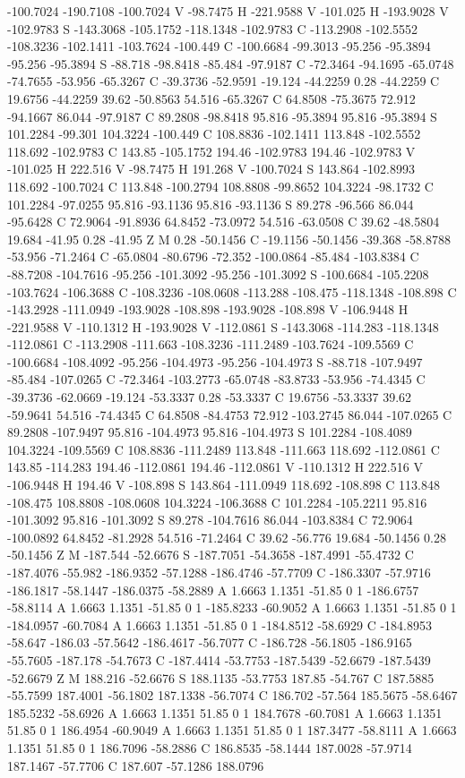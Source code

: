 {{{-100.7024 -190.7108 -100.7024 V -98.7475 H -221.9588 V -101.025 H -193.9028 V -102.9783 S -143.3068 -105.1752 -118.1348 -102.9783 C -113.2908 -102.5552 -108.3236 -102.1411 -103.7624 -100.449 C -100.6684 -99.3013 -95.256 -95.3894 -95.256 -95.3894 S -88.718 -98.8418 -85.484 -97.9187 C -72.3464 -94.1695 -65.0748 -74.7655 -53.956 -65.3267 C -39.3736 -52.9591 -19.124 -44.2259 0.28 -44.2259 C 19.6756 -44.2259 39.62 -50.8563 54.516 -65.3267 C 64.8508 -75.3675 72.912 -94.1667 86.044 -97.9187 C 89.2808 -98.8418 95.816 -95.3894 95.816 -95.3894 S 101.2284 -99.301 104.3224 -100.449 C 108.8836 -102.1411 113.848 -102.5552 118.692 -102.9783 C 143.85 -105.1752 194.46 -102.9783 194.46 -102.9783 V -101.025 H 222.516 V -98.7475 H 191.268 V -100.7024 S 143.864 -102.8993 118.692 -100.7024 C 113.848 -100.2794 108.8808 -99.8652 104.3224 -98.1732 C 101.2284 -97.0255 95.816 -93.1136 95.816 -93.1136 S 89.278 -96.566 86.044 -95.6428 C 72.9064 -91.8936 64.8452 -73.0972 54.516 -63.0508 C 39.62 -48.5804 19.684 -41.95 0.28 -41.95 Z M 0.28 -50.1456 C -19.1156 -50.1456 -39.368 -58.8788 -53.956 -71.2464 C -65.0804 -80.6796 -72.352 -100.0864 -85.484 -103.8384 C -88.7208 -104.7616 -95.256 -101.3092 -95.256 -101.3092 S -100.6684 -105.2208 -103.7624 -106.3688 C -108.3236 -108.0608 -113.288 -108.475 -118.1348 -108.898 C -143.2928 -111.0949 -193.9028 -108.898 -193.9028 -108.898 V -106.9448 H -221.9588 V -110.1312 H -193.9028 V -112.0861 S -143.3068 -114.283 -118.1348 -112.0861 C -113.2908 -111.663 -108.3236 -111.2489 -103.7624 -109.5569 C -100.6684 -108.4092 -95.256 -104.4973 -95.256 -104.4973 S -88.718 -107.9497 -85.484 -107.0265 C -72.3464 -103.2773 -65.0748 -83.8733 -53.956 -74.4345 C -39.3736 -62.0669 -19.124 -53.3337 0.28 -53.3337 C 19.6756 -53.3337 39.62 -59.9641 54.516 -74.4345 C 64.8508 -84.4753 72.912 -103.2745 86.044 -107.0265 C 89.2808 -107.9497 95.816 -104.4973 95.816 -104.4973 S 101.2284 -108.4089 104.3224 -109.5569 C 108.8836 -111.2489 113.848 -111.663 118.692 -112.0861 C 143.85 -114.283 194.46 -112.0861 194.46 -112.0861 V -110.1312 H 222.516 V -106.9448 H 194.46 V -108.898 S 143.864 -111.0949 118.692 -108.898 C 113.848 -108.475 108.8808 -108.0608 104.3224 -106.3688 C 101.2284 -105.2211 95.816 -101.3092 95.816 -101.3092 S 89.278 -104.7616 86.044 -103.8384 C 72.9064 -100.0892 64.8452 -81.2928 54.516 -71.2464 C 39.62 -56.776 19.684 -50.1456 0.28 -50.1456 Z M -187.544 -52.6676 S -187.7051 -54.3658 -187.4991 -55.4732 C -187.4076 -55.982 -186.9352 -57.1288 -186.4746 -57.7709 C -186.3307 -57.9716 -186.1817 -58.1447 -186.0375 -58.2889 A 1.6663 1.1351 -51.85 0 1 -186.6757 -58.8114 A 1.6663 1.1351 -51.85 0 1 -185.8233 -60.9052 A 1.6663 1.1351 -51.85 0 1 -184.0957 -60.7084 A 1.6663 1.1351 -51.85 0 1 -184.8512 -58.6929 C -184.8953 -58.647 -186.03 -57.5642 -186.4617 -56.7077 C -186.728 -56.1805 -186.9165 -55.7605 -187.178 -54.7673 C -187.4414 -53.7753 -187.5439 -52.6679 -187.5439 -52.6679 Z M 188.216 -52.6676 S 188.1135 -53.7753 187.85 -54.767 C 187.5885 -55.7599 187.4001 -56.1802 187.1338 -56.7074 C 186.702 -57.564 185.5675 -58.6467 185.5232 -58.6926 A 1.6663 1.1351 51.85 0 1 184.7678 -60.7081 A 1.6663 1.1351 51.85 0 1 186.4954 -60.9049 A 1.6663 1.1351 51.85 0 1 187.3477 -58.8111 A 1.6663 1.1351 51.85 0 1 186.7096 -58.2886 C 186.8535 -58.1444 187.0028 -57.9714 187.1467 -57.7706 C 187.607 -57.1286 188.0796 }}}
